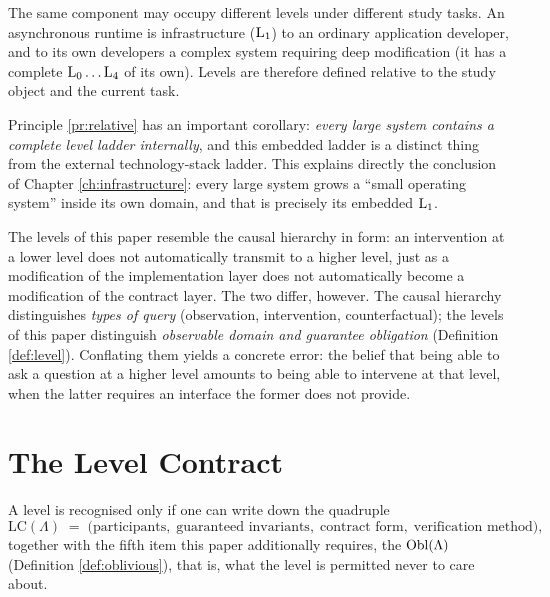 \begin{principle}\label{pr:relative}
The same component may occupy different levels under different study tasks. An asynchronous
runtime is infrastructure ($\mathrm{L}_{1}$) to an ordinary application developer, and to its own
developers a complex system requiring deep modification (it has a complete
$\mathrm{L}_{0} \dots \mathrm{L}_{4}$ of its own). Levels are therefore defined relative to the study object
and the current task.
\end{principle}

Principle \ref{pr:relative} has an important corollary: \emph{every large system contains a
complete level ladder internally}, and this embedded ladder is a distinct thing from the
external technology-stack ladder. This explains directly the conclusion of
Chapter \ref{ch:infrastructure}: every large system grows a ``small operating system'' inside
its own domain, and that is precisely its embedded $\mathrm{L}_{1}$.

\begin{remark}\label{rmk:pearl}
The levels of this paper resemble the causal hierarchy \cite{pearl2009} in form: an
intervention at a lower level does not automatically transmit to a higher level, just as a
modification of the implementation layer does not automatically become a modification of the
contract layer. The two differ, however. The causal hierarchy distinguishes \emph{types of
query} (observation, intervention, counterfactual); the levels of this paper distinguish
\emph{observable domain and guarantee obligation} (Definition \ref{def:level}). Conflating
them yields a concrete error: the belief that being able to ask a question at a higher level
amounts to being able to intervene at that level, when the latter requires an interface the
former does not provide.
\end{remark}

\section{The Level Contract}\label{sec:four-tuple}

\begin{definition}\label{def:level-contract}
A level is recognised only if one can write down the quadruple
\begin{equation}\label{eq:level-contract}
\mathrm{LC}(\Lambda) \;=\;
\bigl(\text{participants},\; \text{guaranteed invariants},\; \text{contract form},\;
\text{verification method}\bigr),
\end{equation}
together with the fifth item this paper additionally requires, the 
$\operatorname{Obl}(\Lambda)$ (Definition \ref{def:oblivious}), that is, what the level is permitted never
to care about.
\end{definition}

